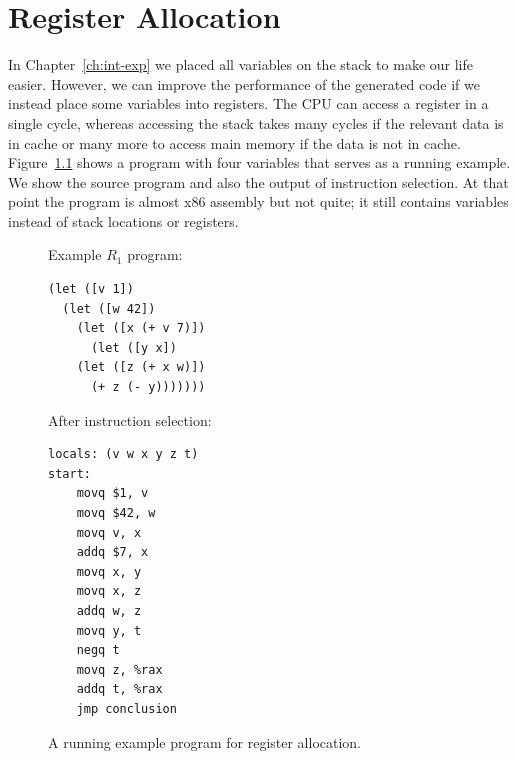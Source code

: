 \documentclass[11pt]{book}
\begin{document}
\chapter{Register Allocation}
\label{ch:register-allocation-r1}


In Chapter~\ref{ch:int-exp} we placed all variables on the stack to
make our life easier. However, we can improve the performance of the
generated code if we instead place some variables into registers.  The
CPU can access a register in a single cycle, whereas accessing the
stack takes many cycles if the relevant data is in cache or many more
to access main memory if the data is not in cache.
Figure~\ref{fig:reg-eg} shows a program with four variables that
serves as a running example. We show the source program and also the
output of instruction selection. At that point the program is almost
x86 assembly but not quite; it still contains variables instead of
stack locations or registers.

\begin{figure}
\begin{minipage}{0.45\textwidth}
Example $R_1$ program:
\begin{lstlisting}
(let ([v 1])
  (let ([w 42])
    (let ([x (+ v 7)])
      (let ([y x])
	(let ([z (+ x w)])
	  (+ z (- y)))))))
\end{lstlisting}
\end{minipage}
\begin{minipage}{0.45\textwidth}
After instruction selection:
\begin{lstlisting}
locals: (v w x y z t)
start:
    movq $1, v
    movq $42, w
    movq v, x
    addq $7, x
    movq x, y
    movq x, z
    addq w, z
    movq y, t
    negq t
    movq z, %rax
    addq t, %rax
    jmp conclusion
\end{lstlisting}
\end{minipage}
\caption{A running example program for register allocation.}
\label{fig:reg-eg}
\end{figure}
\end{document}
